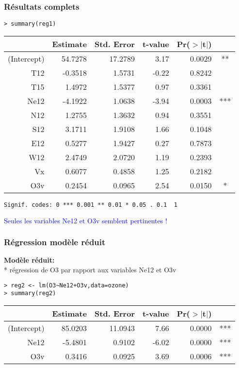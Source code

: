 \documentclass{beamer}
\begin{document}
\begin{frame}[fragile]
\frametitle{\bf  R\'esultats complets}
\begin{small}
\begin{verbatim}
> summary(reg1)
\end{verbatim}
\begin{tabular}{r|rrrrc}
 & Estimate & Std. Error & t-value & Pr($>$$|$t$|$) & \\ 
  \hline
(Intercept) & 54.7278 & 17.2789 & 3.17 & 0.0029 & ** \\ 
  T12 & -0.3518 & 1.5731 & -0.22 & 0.8242 & \\ 
  T15 & 1.4972 & 1.5377 & 0.97 & 0.3361 & \\ 
  Ne12 & -4.1922 & 1.0638 & -3.94 & 0.0003 & ***\\ 
  N12 & 1.2755 & 1.3632 & 0.94 & 0.3551 & \\ 
  S12 & 3.1711 & 1.9108 & 1.66 & 0.1048 & \\ 
  E12 & 0.5277 & 1.9427 & 0.27 & 0.7873 & \\ 
  W12 & 2.4749 & 2.0720 & 1.19 & 0.2393 & \\ 
  Vx & 0.6077 & 0.4858 & 1.25 & 0.2182 & \\ 
  O3v & 0.2454 & 0.0965 & 2.54 & 0.0150 &*
\end{tabular}
\begin{verbatim}
Signif. codes: 0 *** 0.001 ** 0.01 * 0.05 . 0.1  1 
\end{verbatim}

\textcolor{blue}{Seules les variables Ne12 et O3v semblent pertinentes !}
\end{small}
\end{frame}


\begin{frame}[fragile]
\frametitle{\bf  R\'egression mod\`ele r\'eduit}
{\bf Mod\`ele r\'eduit:}\\* r\'egression de O3 par rapport aux variables Ne12 et O3v
\medskip

\begin{small}
\begin{verbatim}
> reg2 <- lm(O3~Ne12+O3v,data=ozone)
> summary(reg2)
\end{verbatim}
\begin{tabular}{r|rrrrc}
 & Estimate & Std. Error & t-value & Pr($>$$|$t$|$) & \\ 
  \hline
(Intercept) & 85.0203 & 11.0943 & 7.66 & 0.0000 &***\\ 
  Ne12 & -5.4801 & 0.9102 & -6.02 & 0.0000 &***\\ 
  O3v & 0.3416 & 0.0925 & 3.69 & 0.0006 & ***\\ 
\end{tabular}
\end{small}
\end{frame}
\end{document}

